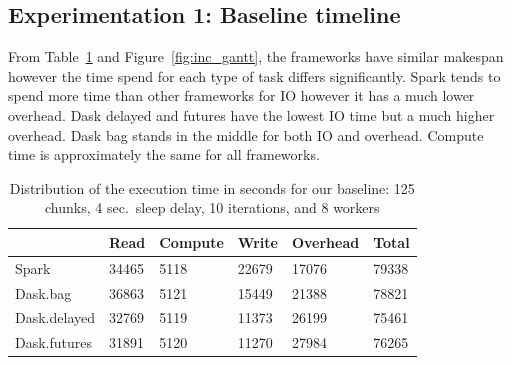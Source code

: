 \documentclass[conference]{IEEEtran}
\begin{document}
\subsection{Experimentation 1: Baseline timeline}
From Table~\ref{tb:inc_base} and Figure~\ref{fig:inc_gantt}, the frameworks have
similar makespan however the time spend for each type of task differs significantly.
Spark tends to spend more time than other frameworks for IO however it has a much
lower overhead. Dask delayed and futures have the lowest IO time but a much higher
overhead. Dask bag stands in the middle for both IO and overhead. Compute time is
approximately the same for all frameworks.

\begin{table}[!t]
    \renewcommand{\arraystretch}{1.3}
    \caption{Distribution of the execution time in seconds for our baseline: 125
    chunks, 4 sec.\ sleep delay, 10 iterations, and 8 workers}\label{tb:inc_base}
    \centering
    \begin{tabular*}{\columnwidth}{llllll}
    \hline
                    & Read  & Compute & Write & Overhead & Total \\ \hline
    Spark        & 34465 & 5118    & 22679 & 17076    & 79338 \\
    Dask.bag     & 36863 & 5121    & 15449 & 21388    & 78821 \\
    Dask.delayed & 32769 & 5119    & 11373 & 26199    & 75461 \\
    Dask.futures & 31891 & 5120    & 11270 & 27984    & 76265 \\ \hline
    \end{tabular*}
 \end{table}
\end{document}
